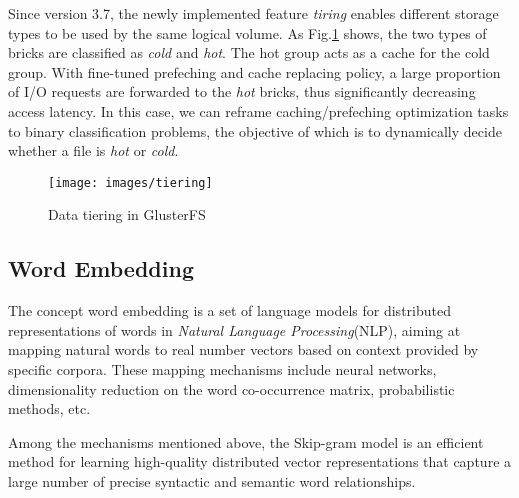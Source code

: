 \documentclass[conference]{IEEEtran}
\begin{document}
Since version 3.7, the newly implemented feature \textit{tiring} enables different storage types to be used by the same logical volume.
As Fig.\ref{fig:tiering} shows, the two types of bricks are classified as \textit{cold} and \textit{hot}. The hot group acts as a cache for the cold group. 
With fine-tuned prefeching and cache replacing policy, a large proportion of I/O requests are forwarded to the \textit{hot} bricks, thus significantly decreasing access latency.
In this case, we can reframe caching/prefeching optimization tasks to binary classification problems,
the objective of which is to dynamically decide whether a file is \textit{hot} or \textit{cold}.

\begin{figure}
\centering
\texttt{[image: images/tiering]}
\caption{Data tiering in GlusterFS}
\label{fig:tiering}
\end{figure}

\subsection{Word Embedding}
The concept word embedding is a set of language models for distributed representations of words in \textit{Natural Language Processing}(NLP), 
aiming at mapping natural words to real number vectors based on context provided by specific corpora.
These mapping mechanisms include neural networks, dimensionality reduction on the word co-occurrence matrix, probabilistic methods, etc.

Among the mechanisms mentioned above, the Skip-gram model is an efficient method for learning high-quality distributed vector representations that capture a large number of precise syntactic and semantic word relationships.

\end{document}
